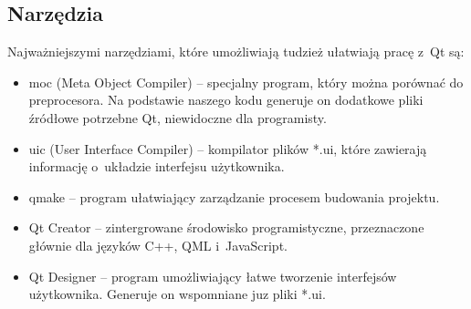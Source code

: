\subsection{Narzędzia}
Najważniejszymi narzędziami, które umożliwiają tudzież ułatwiają pracę z~Qt są:
\begin{itemize}
\item moc (Meta Object Compiler) -- specjalny program, który można porównać do preprocesora. Na podstawie naszego kodu generuje on dodatkowe pliki źródłowe potrzebne Qt, niewidoczne dla programisty.
\item uic (User Interface Compiler) -- kompilator plików *.ui, które zawierają informację o~układzie interfejsu użytkownika.
\item qmake -- program ułatwiający zarządzanie procesem budowania projektu.
\item Qt Creator -- zintergrowane środowisko programistyczne, przeznaczone głównie dla języków C++, QML i~JavaScript.
\item Qt Designer -- program umożliwiający łatwe tworzenie interfejsów użytkownika. Generuje on wspomniane juz pliki *.ui.
\end{itemize}


